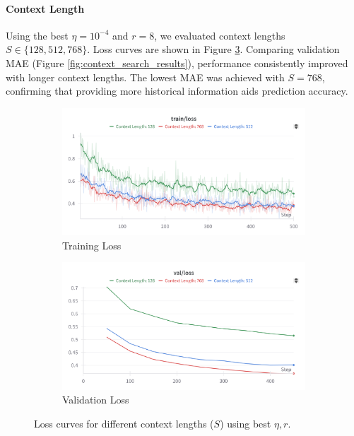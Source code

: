 \documentclass{article}
\begin{document}
\paragraph{Context Length}
Using the best $\eta=10^{-4}$ and $r=8$, we evaluated context lengths $S \in \{128, 512, 768\}$. Loss curves are shown in Figure \ref{fig:context_search_loss_curves}. Comparing validation MAE (Figure \ref{fig:context_search_results}), performance consistently improved with longer context lengths. The lowest MAE was achieved with $S=768$, confirming that providing more historical information aids prediction accuracy. 

\begin{figure}[!htbp]
    \centering
    \begin{subfigure}[b]{0.48\linewidth} \centering
        \includegraphics[width=\linewidth]{M2 Course Work/Images/sweep_context_length_training.png}
        \caption{Training Loss} \label{fig:context_search_train_loss}
    \end{subfigure} \hfill
    \begin{subfigure}[b]{0.48\linewidth} \centering
        \includegraphics[width=\linewidth]{M2 Course Work/Images/sweep_context_length_validation.png}
        \caption{Validation Loss} \label{fig:context_search_valid_loss}
    \end{subfigure}
    \caption{Loss curves for different context lengths ($S$) using best $\eta, r$.} %
    \label{fig:context_search_loss_curves}
\end{figure}
\end{document}
